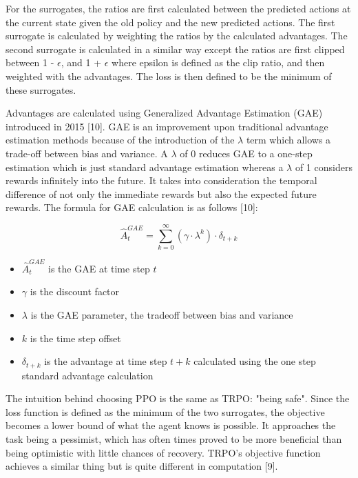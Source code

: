 \documentclass{article}
\begin{document}
	For the surrogates, the ratios are first calculated between the predicted actions at the current state given the old policy and the new predicted actions. The first surrogate is calculated by weighting the ratios by the calculated advantages. The second surrogate is calculated in a similar way except the ratios are first clipped between 1 - $\epsilon$, and 1 + $\epsilon$ where epsilon is defined as the clip ratio, and then weighted with the advantages. The loss is then defined to be the minimum of these surrogates.
	
	Advantages are calculated using Generalized Advantage Estimation (GAE) introduced in 2015 [10]. GAE is an improvement upon traditional advantage estimation methods because of the introduction of the $\lambda$ term which allows a trade-off between bias and variance. A $\lambda$ of 0 reduces GAE to a one-step estimation which is just standard advantage estimation whereas a $\lambda$ of 1 considers rewards infinitely into the future. It takes into consideration the temporal difference of not only the immediate rewards but also the expected future rewards. The formula for GAE calculation is as follows [10]:
	
	\begin{equation}
		\hat{A}^{GAE}_{t} = \sum_{k=0}^{\infty}(\gamma\cdot\lambda^{k})\cdot\delta_{t+k}
	\end{equation}
	\begin{itemize}
		\item $\hat{A}^{GAE}_{t}$ is the GAE at time step $t$
		\item $\gamma$ is the discount factor
		\item $\lambda$ is the GAE parameter, the tradeoff between bias and variance
		\item $k$ is the time step offset
		\item $\delta_{t+k}$ is the advantage at time step $t+k$ calculated using the one step standard advantage calculation
	\end{itemize}
	
	The intuition behind choosing PPO is the same as TRPO: "being safe". Since the loss function is defined as the minimum of the two surrogates, the objective becomes a lower bound of what the agent knows is possible. It approaches the task being a pessimist, which has often times proved to be more beneficial than being optimistic with little chances of recovery. TRPO's objective function achieves a similar thing but is quite different in computation [9].
	
\end{document}
